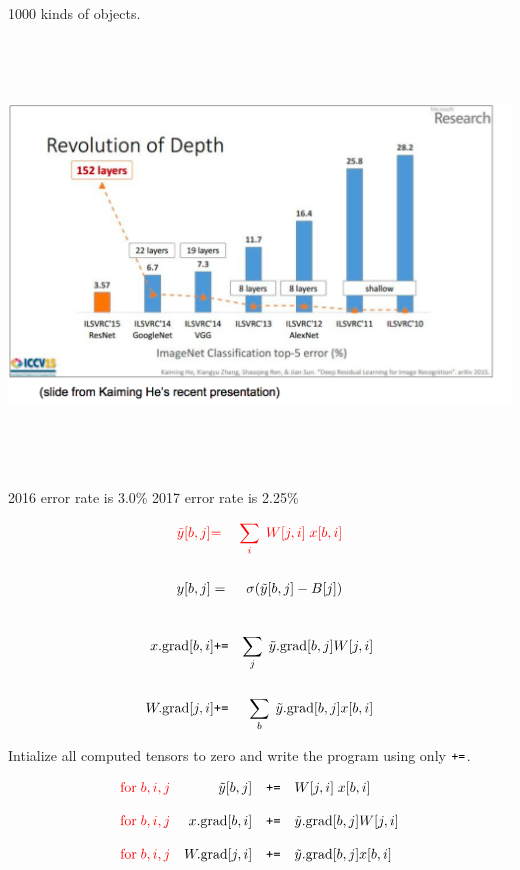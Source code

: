 {

1000 kinds of objects.

\vfill
\centerline{\includegraphics[height=4.5in]{../images/IVLSRC}}
2016 error rate is 3.0\% \hspace{1.0in} 2017 error rate is 2.25\%

\vspace{-3ex}
\begin{eqnarray*}
  {\color{red} \tilde{y}[b,j]} & {\color{red}  =} & {\color{red} \sum_i\;W[j,i]\;x[b,i]} \\
  \\
  y[b,j] & = & \sigma(\tilde{y}[b,j] - B[j]) \\
  \end{eqnarray*}

\vspace{-5ex}
{\color{red} 
  \begin{eqnarray*}
  \\
  x.\mathrm{grad}[b,i] & \mbox{\tt +=} & \sum_j\;\tilde{y}.\mathrm{grad}[b,j]W[j,i] \\
  \\
  W.\mathrm{grad}[j,i] & \mbox{\tt +=} & \sum_b\;\tilde{y}.\mathrm{grad}[b,j]x[b,i]
\end{eqnarray*}
}

Intialize all computed tensors to zero and write the program using only $\mbox{\tt +=}$.

$$
\begin{array}{lrcl}
{\color{red} \mathrm{for}\;b,i,j} & \tilde{y}[b,j] & \mbox{\tt +=} & W[j,i]\;x[b,i] \\
  \\
{\color{red} \mathrm{for}\;b,i,j} &  x.\mathrm{grad}[b,i] & \mbox{\tt +=} & \tilde{y}.\mathrm{grad}[b,j]W[j,i] \\
  \\
{\color{red} \mathrm{for}\;b,i,j} &  W.\mathrm{grad}[j,i] & \mbox{\tt +=} & \tilde{y}.\mathrm{grad}[b,j]x[b,i]
\end{array}
$$

}
